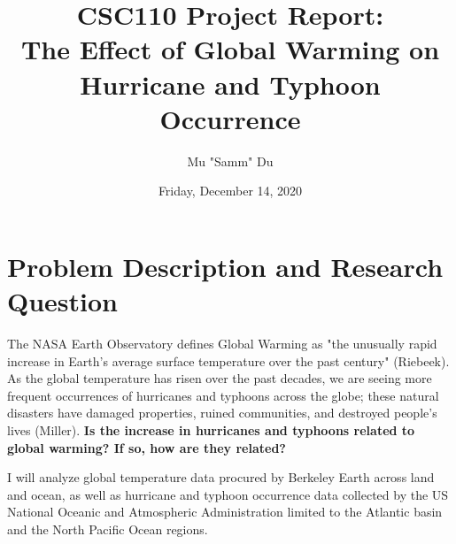 \documentclass[fontsize=11pt]{article}
\title{CSC110 Project Report: \\The Effect of Global Warming on Hurricane and Typhoon Occurrence}
\author{Mu "Samm" Du}
\date{Friday, December 14, 2020}
\begin{document}
\maketitle

\section*{Problem Description and Research Question}

\qquad The NASA Earth Observatory defines Global Warming as "the unusually rapid increase in Earth’s average surface temperature over the past century" (Riebeek). As the global temperature has risen over the past decades, we are seeing more frequent occurrences of hurricanes and typhoons across the globe; these natural disasters have damaged properties, ruined communities, and destroyed people's lives (Miller). \textbf{Is the increase in hurricanes and typhoons related to global warming? If so, how are they related?} 

\enspace I will analyze global temperature data procured by Berkeley Earth across land and ocean, as well as hurricane and typhoon occurrence data collected by the US National Oceanic and Atmospheric Administration limited to the Atlantic basin and the North Pacific Ocean regions.
\end{document}
